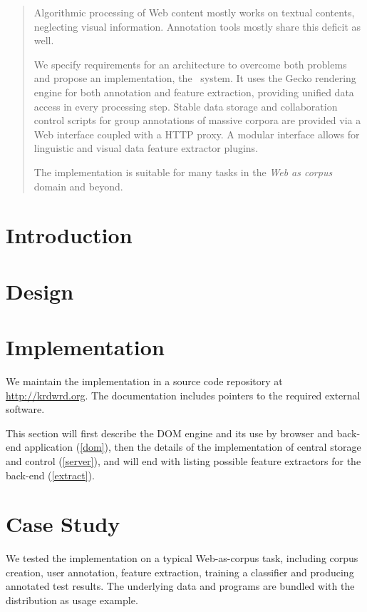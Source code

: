 
\begin{abstract}
Algorithmic processing of Web content mostly works on textual contents, neglecting visual information.
Annotation tools mostly share this deficit as well.

We specify requirements for an architecture to overcome both problems and propose an implementation, the \KrdWrd~system.
It uses the Gecko rendering engine for both annotation and feature extraction, providing unified data access in every processing step.
Stable data storage and collaboration control scripts for group annotations of massive corpora are provided via a Web interface coupled with a HTTP proxy.
A modular interface allows for linguistic and visual data feature extractor plugins.

The implementation is suitable for many tasks in the \textit{Web as corpus} domain and beyond.
\end{abstract}

\section{Introduction}


\section{Design\label{design}}


\section{Implementation\label{impl}}

We maintain the implementation in a source code repository at \url{http://krdwrd.org}.
The documentation includes pointers to the required external software.

This section will first describe the DOM engine and its use by browser and back-end application (\ref{dom}),
then the details of the implementation of central storage and control (\ref{server}), and will end with listing possible feature extractors for the back-end (\ref{extract}).




\section{Case Study\label{casestudy}}

We tested the implementation on a typical Web-as-corpus task, including corpus creation, user annotation, feature extraction, training a classifier and producing annotated test results.
The underlying data and programs are bundled with the {\KrdWrd} distribution as usage example.

